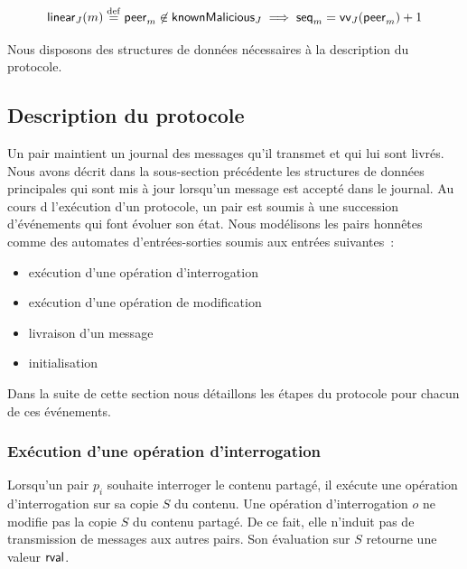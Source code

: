 
\begin{equation*}
\operatorname{\mathsf{linear}}_J(m) \overset{\mathrm{def}}{=} \operatorname{\mathsf{peer}}_m \not\in \operatorname{\mathsf{knownMalicious}}_J \implies \operatorname{\mathsf{seq}}_m = \operatorname{\mathsf{vv}}_J(\operatorname{\mathsf{peer}}_m) + 1
\end{equation*}

Nous disposons des structures de données nécessaires à la description du protocole.


\subsection{Description du protocole}

Un pair maintient un journal des messages qu'il transmet et qui lui sont livrés.
Nous avons décrit dans la sous-section précédente les structures de données principales qui sont mis à jour lorsqu'un message est accepté dans le journal.
Au cours d l'exécution d'un protocole, un pair est soumis à une succession d'événements qui font évoluer son état.
Nous modélisons les pairs honnêtes comme des automates d'entrées-sorties soumis aux entrées suivantes~:
\begin{itemize}
    \item exécution d'une opération d'interrogation
    \item exécution d'une opération de modification
    \item livraison d'un message
    \item initialisation
\end{itemize}

Dans la suite de cette section nous détaillons les étapes du protocole pour chacun de ces événements.

\subsubsection{Exécution d'une opération d'interrogation}

Lorsqu'un pair $p_i$ souhaite interroger le contenu partagé, il exécute une opération d'interrogation sur sa copie $S$ du contenu.
Une opération d'interrogation $o$ ne modifie pas la copie $S$ du contenu partagé.
De ce fait, elle n'induit pas de transmission de messages aux autres pairs.
Son évaluation sur $S$ retourne une valeur $\operatorname{\mathsf{rval}}$.

